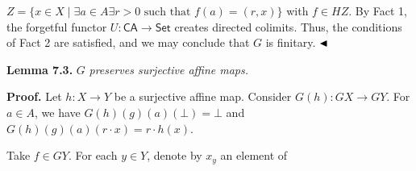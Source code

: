\hypertarget{html:S7.SS0.SSS0.P0.SPx1.p3.m6}{}\({Z=\{x\in X\mid\exists a\in A\exists r>0\text{ such that }f(a)=(r,x)\}}\) with %
\hypertarget{html:S7.SS0.SSS0.P0.SPx1.p3.m7}{}\({f\in HZ}\). By Fact 1, the forgetful functor %
\hypertarget{html:S7.SS0.SSS0.P0.SPx1.p3.m8}{}\({U\colon\mathsf{CA}\to\mathsf{Set}}\) creates directed colimits. Thus, the conditions of Fact 2 are satisfied, and we may conclude that %
\hypertarget{html:S7.SS0.SSS0.P0.SPx1.p3.m9}{}\({G}\) is finitary. %
\hypertarget{html:S7.SS0.SSS0.P0.SPx1.p3.m10}{}\({\hfill\blacktriangleleft}\)
\par\medskip
\hypertarget{html:S7.Thmtheorem3}{} \par\noindent\textbf{\textbf{Lemma 7.3}\textbf{.}}\quad  %
\hypertarget{html:S7.Thmtheorem3.p1}{} %
\hypertarget{html:S7.Thmtheorem3.p1.m1}{}\({G}\)\emph{ preserves surjective affine maps.}
\par\medskip
\hypertarget{html:S7.SS0.SSS0.P0.SPx2}{} \par\noindent\textbf{Proof.}\quad  %
\hypertarget{html:S7.SS0.SSS0.P0.SPx2.p1}{} Let %
\hypertarget{html:S7.SS0.SSS0.P0.SPx2.p1.m1}{}\({h\colon X\to Y}\) be a surjective affine map. Consider %
\hypertarget{html:S7.SS0.SSS0.P0.SPx2.p1.m2}{}\({G(h)\colon GX\to GY}\). For %
\hypertarget{html:S7.SS0.SSS0.P0.SPx2.p1.m3}{}\({a\in A}\), we have %
\hypertarget{html:S7.SS0.SSS0.P0.SPx2.p1.m4}{}\({G(h)(g)(a)(\bot)=\bot}\) and %
\hypertarget{html:S7.SS0.SSS0.P0.SPx2.p1.m5}{}\({G(h)(g)(a)(r\cdot x)=r\cdot h(x)}\).
\par\medskip
\hypertarget{html:S7.SS0.SSS0.P0.SPx2.p2}{} Take %
\hypertarget{html:S7.SS0.SSS0.P0.SPx2.p2.m1}{}\({f\in GY}\). For each %
\hypertarget{html:S7.SS0.SSS0.P0.SPx2.p2.m2}{}\({y\in Y}\), denote by %
\hypertarget{html:S7.SS0.SSS0.P0.SPx2.p2.m3}{}\({x_{y}}\) an element of %
